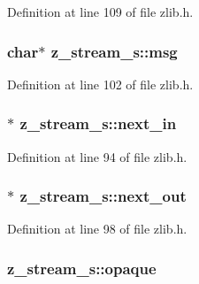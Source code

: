 Definition at line 109 of file zlib.\-h.

\hypertarget{structz__stream__s_a9b2f745fc780e3b33e2935f8c650a326}{
\subsubsection[{msg}]{\setlength{\rightskip}{0pt plus 5cm}char$\ast$ z\-\_\-stream\-\_\-s\-::msg}}\label{structz__stream__s_a9b2f745fc780e3b33e2935f8c650a326}


Definition at line 102 of file zlib.\-h.

\hypertarget{structz__stream__s_a21d2c026f0f2fcd67f33011231f8ed00}{
\subsubsection[{next\-\_\-in}]{$\ast$ z\-\_\-stream\-\_\-s\-::next\-\_\-in}}\label{structz__stream__s_a21d2c026f0f2fcd67f33011231f8ed00}


Definition at line 94 of file zlib.\-h.

\hypertarget{structz__stream__s_aed4a02cfe93e975314fed50b04427bf3}{
\subsubsection[{next\-\_\-out}]{$\ast$ z\-\_\-stream\-\_\-s\-::next\-\_\-out}}\label{structz__stream__s_aed4a02cfe93e975314fed50b04427bf3}


Definition at line 98 of file zlib.\-h.

\hypertarget{structz__stream__s_ab72467f908d2ce65d5b42ee6556ef8bb}{
\subsubsection[{opaque}]{ z\-\_\-stream\-\_\-s\-::opaque}}\label{structz__stream__s_ab72467f908d2ce65d5b42ee6556ef8bb}


